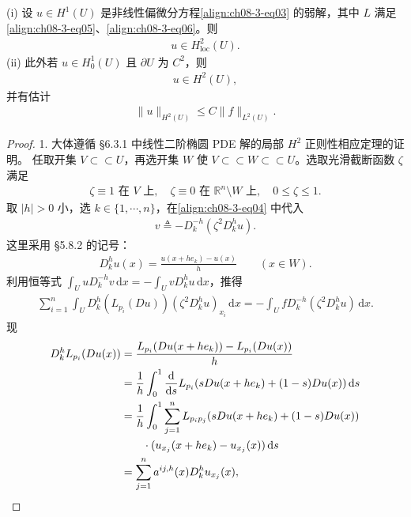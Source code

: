 \documentclass[../../main.tex]{subfiles}
\begin{document}
\begin{theorem}[极小元的二阶导数]\label{theorem:ch08-3-1-二阶导数}
(i) 设 $u\in H^1(U)$ 是非线性偏微分方程\eqref{align:ch08-3-eq03} 的弱解，其中 $L$ 满足\eqref{align:ch08-3-eq05}、\eqref{align:ch08-3-eq06}。则
\begin{align*}
u\in H^2_{\mathrm{loc}}(U).
\end{align*}
(ii) 此外若 $u\in H_0^1(U)$ 且 $\partial U$ 为 $C^2$，则
\begin{align*}
u\in H^2(U),
\end{align*}
并有估计
\begin{align*}
\|u\|_{H^2(U)}\leqslant C\|f\|_{L^2(U)}.
\end{align*}
\begin{proof}
1. 大体遵循 \S6.3.1 中线性二阶椭圆 PDE 解的局部 $H^2$ 正则性相应定理的证明。
任取开集 $V\subset \subset U$，再选开集 $W$ 使 $V\subset \subset W\subset \subset U$。选取光滑截断函数 $\zeta$ 满足
\begin{align*}
\zeta\equiv 1\text{ 在 }V\text{ 上},\quad \zeta\equiv 0\text{ 在 }\mathbb{R}^n\setminus W\text{ 上},\quad 0\leqslant\zeta\leqslant 1.
\end{align*}
取 $|h|>0$ 小，选 $k\in\{1,\cdots,n\}$，在\eqref{align:ch08-3-eq04} 中代入
\begin{align*}
v\triangleq -D_k^{-h}(\zeta^2 D_k^h u).
\end{align*}
这里采用 \S5.8.2 的记号：
\begin{align*}
D_k^h u(x)=\frac{u(x+he_k)-u(x)}{h}\qquad (x\in W).
\end{align*}
利用恒等式 $\int_U u D_k^{-h}v\,\mathrm{d}x=-\int_U vD_k^h u\,\mathrm{d}x$，推得
\begin{align}
\sum_{i=1}^n\int_U D_k^h(L_{p_i}(Du))(\zeta^2 D_k^h u)_{x_i}\,\mathrm{d}x=-\int_U fD_k^{-h}(\zeta^2 D_k^h u)\,\mathrm{d}x.\label{align:ch08-3-eq07}
\end{align}
现
\begin{align}
D_k^h L_{p_i}(Du(x))&=\frac{L_{p_i}(Du(x+he_k))-L_{p_i}(Du(x))}{h}\notag\\
&=\frac1h\int_0^1\frac{\mathrm{d}}{\mathrm{d}s}L_{p_i}(sDu(x+he_k)+(1-s)Du(x))\,\mathrm{d}s\notag\\
&=\frac1h\int_0^1\sum_{j=1}^n L_{p_ip_j}(sDu(x+he_k)+(1-s)Du(x))\notag\\
&\qquad\cdot(u_{x_j}(x+he_k)-u_{x_j}(x))\,\mathrm{d}s\notag\\
&=\sum_{j=1}^n a^{ij,h}(x)D_k^h u_{x_j}(x),\label{align:ch08-3-eq08}
\end{align}

\end{proof}
\end{theorem}
\end{document}

